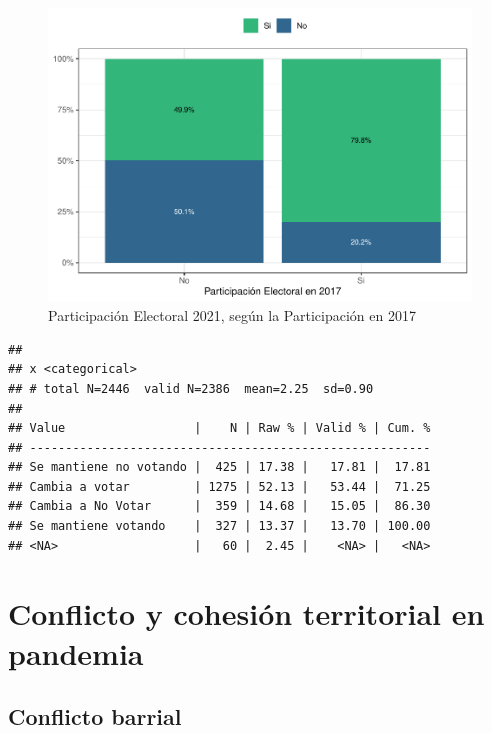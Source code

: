 \documentclass[
  12pt,
  openany]{book}
\begin{document}
\begin{figure}

{\centering \includegraphics{reporte-elsoc_files/figure-latex/2020-vs-2021-1} 

}

\caption{Participación Electoral 2021, según la Participación en 2017}\label{fig:2020-vs-2021}
\end{figure}

\begin{verbatim}
## 
## x <categorical>
## # total N=2446  valid N=2386  mean=2.25  sd=0.90
## 
## Value                  |    N | Raw % | Valid % | Cum. %
## --------------------------------------------------------
## Se mantiene no votando |  425 | 17.38 |   17.81 |  17.81
## Cambia a votar         | 1275 | 52.13 |   53.44 |  71.25
## Cambia a No Votar      |  359 | 14.68 |   15.05 |  86.30
## Se mantiene votando    |  327 | 13.37 |   13.70 | 100.00
## <NA>                   |   60 |  2.45 |    <NA> |   <NA>
\end{verbatim}

\hypertarget{conflicto-y-cohesiuxf3n-territorial-en-pandemia}{%
\chapter{Conflicto y cohesión territorial en pandemia}\label{conflicto-y-cohesiuxf3n-territorial-en-pandemia}}

\hypertarget{conflicto-barrial}{%
\section{Conflicto barrial}\label{conflicto-barrial}}
\end{document}
